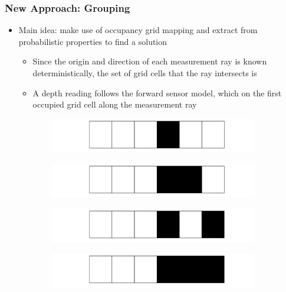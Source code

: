 \documentclass[11pt,professionalfonts,hyperref={pdftex,pdfpagemode=none,pdfstartview=FitH}]{beamer}
\renewcommand{\emph}[1]{\textit{\textbf{\color{blue}{#1}}}}
\begin{document}
\begin{frame}
\frametitle{New Approach: Grouping}

\begin{itemize}
    \item Main idea: make use of occupancy grid mapping \emph{assumptions} and extract \emph{patterns} from probabilistic properties to find a \emph{computationally-efficient} solution
	\begin{itemize}
		\item Since the origin and direction of each measurement ray is known deterministically, the set of grid cells that the ray intersects is \emph{known through geometry}
		\item A depth reading follows the forward sensor model, which \emph{only depends} on the first occupied grid cell along the measurement ray
	\end{itemize}
\end{itemize}
\setcounter{subfigure}{0}
\begin{figure}
  \centering
  \begin{subfigure}[t]{.45\linewidth}
    \centering\includegraphics[width=\linewidth]{rkplus_1.png}
  \end{subfigure}
  \begin{subfigure}[t]{.45\linewidth}
    \centering\includegraphics[width=\linewidth]{rkplus_2.png}
  \end{subfigure}
    \begin{subfigure}[t]{.45\linewidth}
    \centering\includegraphics[width=\linewidth]{rkplus_3.png}
  \end{subfigure}
  \begin{subfigure}[t]{.45\linewidth}
    \centering\includegraphics[width=\linewidth]{rkplus_4.png}
  \end{subfigure}
\end{figure}

\end{frame}
\end{document}
